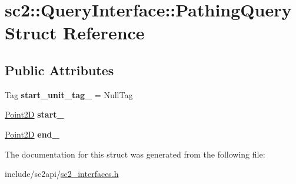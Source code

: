 \hypertarget{structsc2_1_1_query_interface_1_1_pathing_query}{}\section{sc2\+:\+:Query\+Interface\+:\+:Pathing\+Query Struct Reference}
\label{structsc2_1_1_query_interface_1_1_pathing_query}
\subsection*{Public Attributes}
\begin{DoxyCompactItemize}
\item 
\mbox{\label{structsc2_1_1_query_interface_1_1_pathing_query_a053891c5abbef300c835a5c2a21407d3}} 
Tag {\bfseries start\+\_\+unit\+\_\+tag\+\_\+} = Null\+Tag
\item 
\mbox{\label{structsc2_1_1_query_interface_1_1_pathing_query_adaa1d6995eb6e0b1b9dac4b45bddf1fa}} 
\hyperlink{structsc2_1_1_point2_d}{Point2D} {\bfseries start\+\_\+}
\item 
\mbox{\label{structsc2_1_1_query_interface_1_1_pathing_query_ac522a86be3b36d3595f67c14a5e0935b}} 
\hyperlink{structsc2_1_1_point2_d}{Point2D} {\bfseries end\+\_\+}
\end{DoxyCompactItemize}


The documentation for this struct was generated from the following file\+:\begin{DoxyCompactItemize}
\item 
include/sc2api/\hyperlink{sc2__interfaces_8h}{sc2\+\_\+interfaces.\+h}\end{DoxyCompactItemize}
